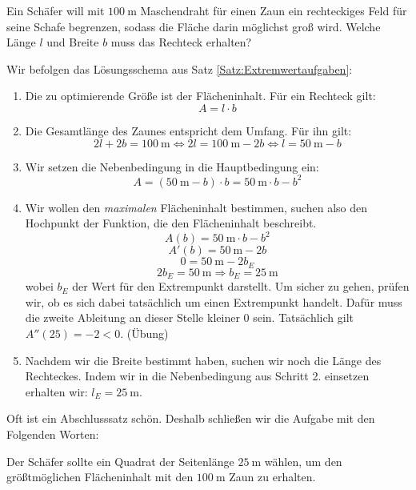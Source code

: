 \documentclass[ngerman, 12pt]{nssheetxea}
\begin{document}
\begin{example}
Ein Schäfer will mit $\SI{100}{\meter}$ Maschendraht für einen Zaun ein rechteckiges Feld für seine Schafe begrenzen, sodass die Fläche darin möglichst groß wird. Welche Länge $l$ und Breite $b$ muss das Rechteck erhalten?\par
Wir befolgen das Lösungsschema aus Satz \ref{Satz:Extremwertaufgaben}:
\begin{enumerate}
\item Die zu optimierende Größe ist der Flächeninhalt. Für ein Rechteck gilt: 
\[ A=l\cdot b \]
\item Die Gesamtlänge des Zaunes entspricht dem Umfang. Für ihn gilt:
\[ 2l + 2b = \SI{100}{\meter}	\Leftrightarrow 2l = \SI{100}{\meter} - 2b \Leftrightarrow l = \SI{50}{\meter}	- b \]
\item Wir setzen die Nebenbedingung in die Hauptbedingung ein: 
\[ A= (\SI{50}{\meter} -b)\cdot b =  \SI{50}{\meter} \cdot b - b^2 \]
\item Wir wollen den \textit{maximalen} Flächeninhalt bestimmen, suchen also den Hochpunkt der Funktion, die den Flächeninhalt beschreibt.
\[ A(b)=  \SI{50}{\meter} \cdot b - b^2\]
\[ A'(b)= \SI{50}{\meter} - 2b \]
\[ 0 = \SI{50}{\meter} - 2b_E \]
\[ 2b_E = \SI{50}{\meter} \Rightarrow b_E = \SI{25}{\meter} \]
wobei $b_E$ der Wert für den Extrempunkt darstellt. Um sicher zu gehen, prüfen wir, ob es sich dabei tatsächlich um einen Extrempunkt handelt. Dafür muss die zweite Ableitung an dieser Stelle kleiner $0$ sein. Tatsächlich gilt $A''(25)=-2 < 0$. (Übung)
\item Nachdem wir die Breite bestimmt haben, suchen wir noch die Länge des Rechteckes. Indem wir in die Nebenbedingung aus Schritt 2. einsetzen erhalten wir: $l_E=\SI{25}{\meter}$. 
\end{enumerate}
Oft ist ein Abschlusssatz schön. Deshalb schließen wir die Aufgabe mit den Folgenden Worten: \par
Der Schäfer sollte ein Quadrat der Seitenlänge $\SI{25}{\meter}$ wählen, um den größtmöglichen Flächeninhalt mit den $\SI{100}{\meter}$ Zaun zu erhalten.
\end{example}

\newpage
\end{document}
